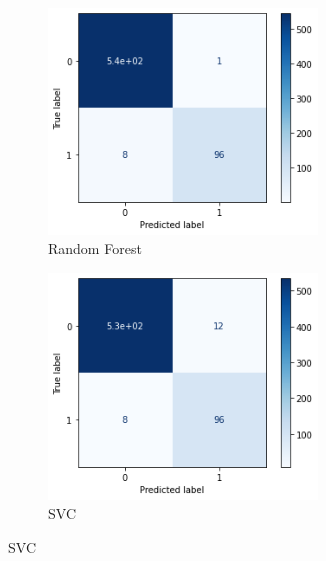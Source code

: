 \begin{figure}[H]
    \begin{subfigure}{0.5\textwidth}
        \includegraphics[width=0.9\linewidth, height=6cm]{img/cm/rf.png}
        \caption{Random Forest}
        \label{fig:rf}
    \end{subfigure}
    \begin{subfigure}{0.5\textwidth}
        \includegraphics[width=0.9\linewidth, height=6cm]{img/cm/svc.png}
        \caption{SVC}
        \label{fig:svc}
    \end{subfigure}
\end{figure}